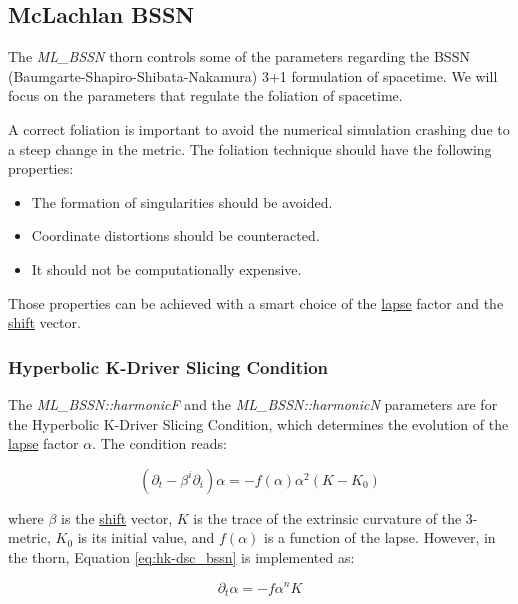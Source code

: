 \documentclass[11pt, a4paper]{article}
\begin{document}
\subsection{McLachlan BSSN}

The \textit{ML\_BSSN} thorn controls some of the parameters regarding the BSSN (Baumgarte-Shapiro-Shibata-Nakamura) 3+1 formulation of spacetime. We will focus on the parameters that regulate the foliation of spacetime.

A correct foliation is important to avoid the numerical simulation crashing due to a steep change in the metric. The foliation technique should have the following properties:

\begin{itemize}
    \item The formation of singularities should be avoided.
    \item Coordinate distortions should be counteracted.
    \item It should not be computationally expensive.
\end{itemize}

\noindent
Those properties can be achieved with a smart choice of the \underline{lapse} factor and the \underline{shift} vector.

\subsubsection{Hyperbolic K-Driver Slicing Condition}

The \textit{ML\_BSSN::harmonicF} and the \textit{ML\_BSSN::harmonicN} parameters are for the Hyperbolic K-Driver Slicing Condition, which determines the evolution of the \underline{lapse} factor \(\alpha\). The condition reads:

\begin{equation} \label{eq:hk-dsc_bssn}
    (\partial_t - \beta^i \partial_i) \alpha = - f(\alpha) \alpha^2 (K - K_0)
\end{equation}

\noindent
where \(\beta\) is the \underline{shift} vector, \(K\) is the trace of the extrinsic curvature of the 3-metric, \(K_0\) is its initial value, and \(f(\alpha)\) is a function of the lapse. However, in the thorn, Equation \ref{eq:hk-dsc_bssn} is implemented as:

\begin{equation} \label{eq:hk-dsc_thorn}
    \partial_t \alpha = - f \alpha^n K
\end{equation}
\end{document}
